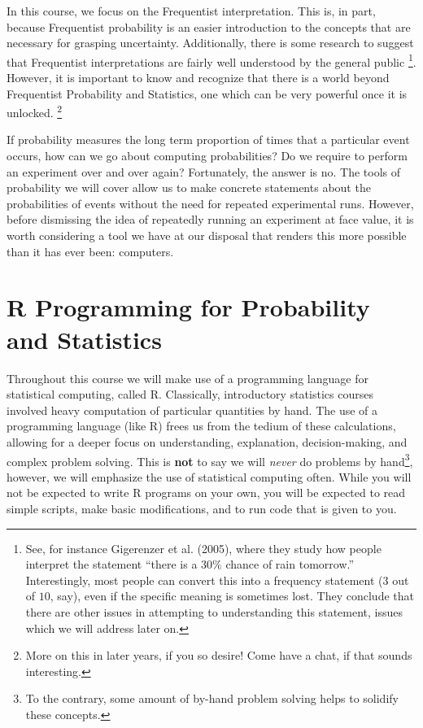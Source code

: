 \documentclass[
  letterpaper,
  DIV=11,
  numbers=noendperiod]{scrreprt}
\theoremstyle{definition}
\theoremstyle{definition}
\theoremstyle{definition}
\theoremstyle{remark}
\begin{document}
In this course, we focus on the Frequentist interpretation. This is, in
part, because Frequentist probability is an easier introduction to the
concepts that are necessary for grasping uncertainty. Additionally,
there is some research to suggest that Frequentist interpretations are
fairly well understood by the general public \footnote{See, for instance
  Gigerenzer et al. (2005), where they study how people interpret the
  statement ``there is a \(30\%\) chance of rain tomorrow.''
  Interestingly, most people can convert this into a frequency statement
  (\(3\) out of \(10\), say), even if the specific meaning is sometimes
  lost. They conclude that there are other issues in attempting to
  understanding this statement, issues which we will address later on.}.
However, it is important to know and recognize that there is a world
beyond Frequentist Probability and Statistics, one which can be very
powerful once it is unlocked. \footnote{More on this in later years, if
  you so desire! Come have a chat, if that sounds interesting.}

If probability measures the long term proportion of times that a
particular event occurs, how can we go about computing probabilities? Do
we require to perform an experiment over and over again? Fortunately,
the answer is no. The tools of probability we will cover allow us to
make concrete statements about the probabilities of events without the
need for repeated experimental runs. However, before dismissing the idea
of repeatedly running an experiment at face value, it is worth
considering a tool we have at our disposal that renders this more
possible than it has ever been: computers.

\section{R Programming for Probability and
Statistics}\label{r-programming-for-probability-and-statistics}

Throughout this course we will make use of a programming language for
statistical computing, called R. Classically, introductory statistics
courses involved heavy computation of particular quantities by hand. The
use of a programming language (like R) frees us from the tedium of these
calculations, allowing for a deeper focus on understanding, explanation,
decision-making, and complex problem solving. This is \textbf{not} to
say we will \emph{never} do problems by hand\footnote{To the contrary,
  some amount of by-hand problem solving helps to solidify these
  concepts.}, however, we will emphasize the use of statistical
computing often. While you will not be expected to write R programs on
your own, you will be expected to read simple scripts, make basic
modifications, and to run code that is given to you.
\end{document}
